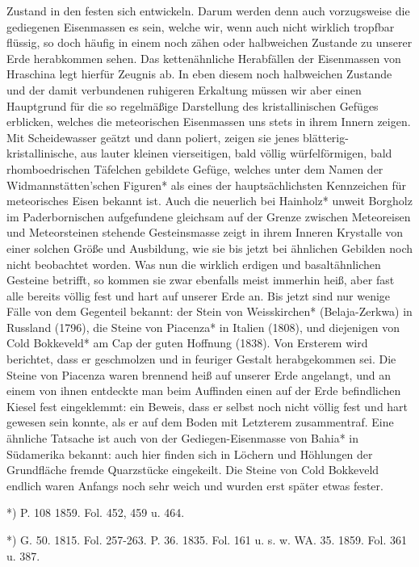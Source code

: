 \documentclass[a4paper, 11pt, oneside, polutonikogreek, german]{article}
\begin{document}
Zustand in den festen sich entwickeln. Darum werden denn auch vorzugsweise die gediegenen Eisenmassen es sein, welche wir, wenn auch nicht wirklich tropfbar flüssig, so doch häufig in einem noch zähen oder halbweichen Zustande zu unserer Erde herabkommen sehen. Das kettenähnliche Herabfällen der Eisenmassen von Hraschina legt hierfür Zeugnis ab. In eben diesem noch halbweichen Zustande und der damit verbundenen ruhigeren Erkaltung müssen wir aber einen Hauptgrund für die so regelmäßige Darstellung des kristallinischen Gefüges erblicken, welches die meteorischen Eisenmassen uns stets in ihrem Innern zeigen. Mit Scheidewasser geätzt und dann poliert, zeigen sie jenes blätterig-kristallinische, aus lauter kleinen vierseitigen, bald völlig würfelförmigen, bald rhomboedrischen Täfelchen gebildete Gefüge, welches unter dem Namen der Widmannstätten'schen Figuren* als eines der hauptsächlichsten Kennzeichen für meteorisches Eisen bekannt ist. Auch die neuerlich bei Hainholz* unweit Borgholz im Paderbornischen aufgefundene gleichsam auf der Grenze zwischen Meteoreisen und Meteorsteinen stehende Gesteinsmasse zeigt in ihrem Inneren Krystalle von einer solchen Größe und Ausbildung, wie sie bis jetzt bei ähnlichen Gebilden noch nicht beobachtet worden. Was nun die wirklich erdigen und basaltähnlichen Gesteine betrifft, so kommen sie zwar ebenfalls meist immerhin heiß, aber fast alle bereits völlig fest und hart auf unserer Erde an. Bis jetzt sind nur wenige Fälle von dem Gegenteil bekannt: der Stein von Weisskirchen* (Belaja-Zerkwa) in Russland (1796), die Steine von Piacenza* in Italien (1808), und diejenigen von Cold Bokkeveld* am Cap der guten Hoffnung (1838). Von Ersterem wird berichtet, dass er geschmolzen und in feuriger Gestalt herabgekommen sei. Die Steine von Piacenza waren brennend heiß auf unserer Erde angelangt, und an einem von ihnen entdeckte man beim Auffinden einen auf der Erde befindlichen Kiesel fest eingeklemmt: ein Beweis, dass er selbst noch nicht völlig fest und hart gewesen sein konnte, als er auf dem Boden mit Letzterem zusammentraf. Eine ähnliche Tatsache ist auch von der Gediegen-Eisenmasse von Bahia* in Südamerika bekannt: auch hier finden sich in Löchern und Höhlungen der Grundfläche fremde Quarzstücke eingekeilt. Die Steine von Cold Bokkeveld endlich waren Anfangs noch sehr weich und wurden erst später etwas fester.

*) P. 108 1859. Fol. 452, 459 u. 464.

*) G. 50. 1815. Fol. 257-263. P. 36. 1835. Fol. 161 u. s. w. WA. 35. 1859. Fol. 361 u. 387.
\end{document}
